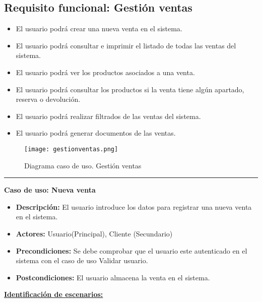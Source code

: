 \subsection{Requisito funcional: Gestión ventas}

\begin{itemize}
 \item El usuario podrá crear una nueva venta en el sistema.
 \item El usuario podrá consultar e imprimir el listado de todas las ventas del sistema.
 \item El usuario podrá ver los productos asociados a una venta.
 \item El usuario podrá consultar los productos si la venta tiene algún apartado, reserva o devolución.
 \item El usuario podrá realizar filtrados de las ventas del sistema.
 \item El usuario podrá generar documentos de las ventas.

\end{itemize}
\begin{figure}[H]
  \centering
    \texttt{[image: gestionventas.png]}
  \caption{Diagrama caso de uso. Gestión ventas}
  \label{cu7}
\end{figure}
\smallskip
\hrule height 1pt
\smallskip
\textbf{Caso de uso: Nueva venta}
\begin{itemize}\renewcommand{\labelitemi}{$\cdot$}
  \item \textbf{Descripción:} El usuario introduce los datos para registrar una nueva venta en el sistema.
  \item \textbf{Actores:} Usuario(Principal), Cliente (Secundario)
  \item \textbf{Precondiciones:} Se debe comprobar que el usuario este autenticado en el sistema con el caso de uso Validar usuario.
  \item \textbf{Postcondiciones:} El usuario almacena la venta en el sistema.
\end{itemize}
\underline{\textbf{Identificación de escenarios:}}
